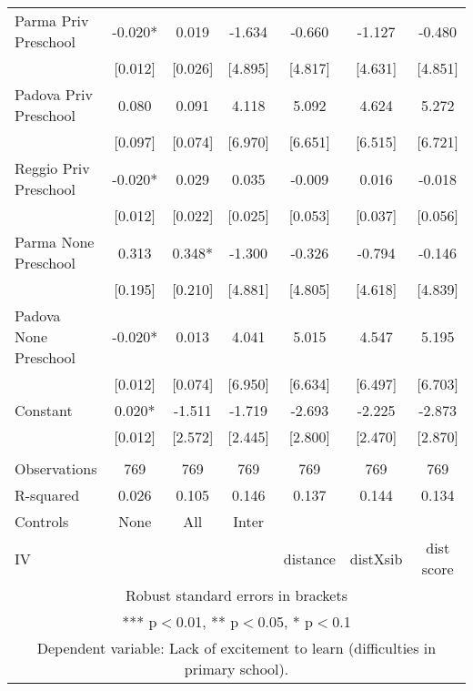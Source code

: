\begin{tabular}{lcccccc}
Parma Priv Preschool & -0.020* & 0.019 & -1.634 & -0.660 & -1.127 & -0.480 \\
 & [0.012] & [0.026] & [4.895] & [4.817] & [4.631] & [4.851] \\
Padova Priv Preschool & 0.080 & 0.091 & 4.118 & 5.092 & 4.624 & 5.272 \\
 & [0.097] & [0.074] & [6.970] & [6.651] & [6.515] & [6.721] \\
Reggio Priv Preschool & -0.020* & 0.029 & 0.035 & -0.009 & 0.016 & -0.018 \\
 & [0.012] & [0.022] & [0.025] & [0.053] & [0.037] & [0.056] \\
Parma None Preschool & 0.313 & 0.348* & -1.300 & -0.326 & -0.794 & -0.146 \\
 & [0.195] & [0.210] & [4.881] & [4.805] & [4.618] & [4.839] \\
Padova None Preschool & -0.020* & 0.013 & 4.041 & 5.015 & 4.547 & 5.195 \\
 & [0.012] & [0.074] & [6.950] & [6.634] & [6.497] & [6.703] \\
Constant & 0.020* & -1.511 & -1.719 & -2.693 & -2.225 & -2.873 \\
 & [0.012] & [2.572] & [2.445] & [2.800] & [2.470] & [2.870] \\
 &  &  &  &  &  &  \\
Observations & 769 & 769 & 769 & 769 & 769 & 769 \\
R-squared & 0.026 & 0.105 & 0.146 & 0.137 & 0.144 & 0.134 \\
Controls & None & All & Inter &  &  &  \\
 IV &  &  &  & distance & distXsib & dist score \\ \hline
\multicolumn{7}{c}{ Robust standard errors in brackets} \\
\multicolumn{7}{c}{ *** p$<$0.01, ** p$<$0.05, * p$<$0.1} \\
\multicolumn{7}{c}{ Dependent variable: Lack of excitement to learn (difficulties in primary school).} \\
\end{tabular}
